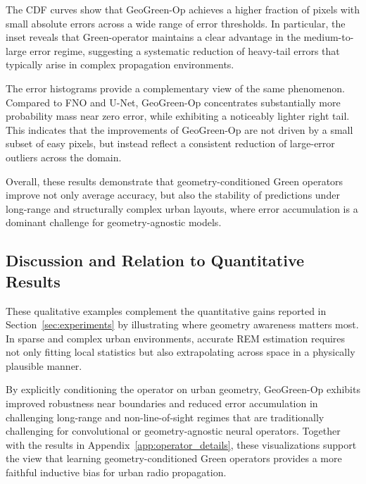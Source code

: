 \documentclass{article}
\begin{document}
The CDF curves show that GeoGreen-Op achieves a higher fraction of pixels with
small absolute errors across a wide range of error thresholds.
In particular, the inset reveals that Green-operator maintains a clear advantage in the
medium-to-large error regime, suggesting a systematic reduction of heavy-tail
errors that typically arise in complex propagation environments.

The error histograms provide a complementary view of the same phenomenon.
Compared to FNO and U-Net, GeoGreen-Op concentrates substantially more
probability mass near zero error, while exhibiting a noticeably lighter right
tail.
This indicates that the improvements of GeoGreen-Op are not driven by a small
subset of easy pixels, but instead reflect a consistent reduction of large-error
outliers across the domain.

Overall, these results demonstrate that geometry-conditioned Green operators
improve not only average accuracy, but also the stability of predictions under
long-range and structurally complex urban layouts, where error accumulation is
a dominant challenge for geometry-agnostic models.


\subsection{Discussion and Relation to Quantitative Results}
\label{app:qualitative_discussion}

These qualitative examples complement the quantitative gains reported in
Section~\ref{sec:experiments} by illustrating where geometry awareness matters
most.
In sparse and complex urban environments, accurate REM estimation requires not
only fitting local statistics but also extrapolating across space in a
physically plausible manner.

By explicitly conditioning the operator on urban geometry, GeoGreen-Op exhibits
improved robustness near boundaries and reduced error accumulation in
challenging long-range and non-line-of-sight regimes
that
are traditionally challenging for convolutional or geometry-agnostic neural
operators.
Together with the results in Appendix~\ref{app:operator_details}, these
visualizations support the view that learning geometry-conditioned Green
operators provides a more faithful inductive bias for urban radio propagation.






\end{document}
